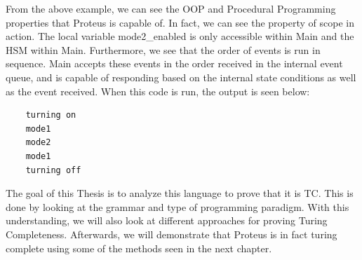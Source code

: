 From the above example, we can see the OOP and Procedural Programming properties that Proteus is capable of.
In fact, we can see the property of scope in action.
The local variable mode2\_enabled is only accessible within Main and the HSM within Main.
Furthermore, we see that the order of events is run in sequence.
Main accepts these events in the order received in the internal event queue, and is capable of responding based on the internal state conditions as well as the event received.
When this code is run, the output is seen below:

\begin{verbatim}
    turning on
    mode1
    mode2
    mode1
    turning off
\end{verbatim}

The goal of this Thesis is to analyze this language to prove that it is TC.
This is done by looking at the grammar and type of programming paradigm.
With this understanding, we will also look at different approaches for proving Turing Completeness.
Afterwards, we will demonstrate that Proteus is in fact turing complete using some of the methods seen in the next chapter.